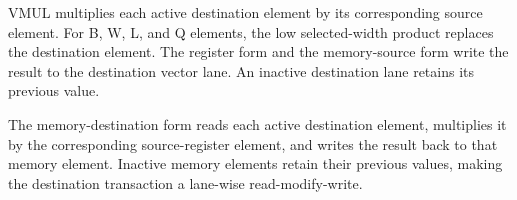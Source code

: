 VMUL multiplies each active destination element by its corresponding source
element. For B, W, L, and Q elements, the low selected-width product replaces
the destination element. The register form and the memory-source form write
the result to the destination vector lane. An inactive destination lane
retains its previous value.

The memory-destination form reads each active destination element, multiplies
it by the corresponding source-register element, and writes the result back
to that memory element. Inactive memory elements retain their previous values,
making the destination transaction a lane-wise read-modify-write.
